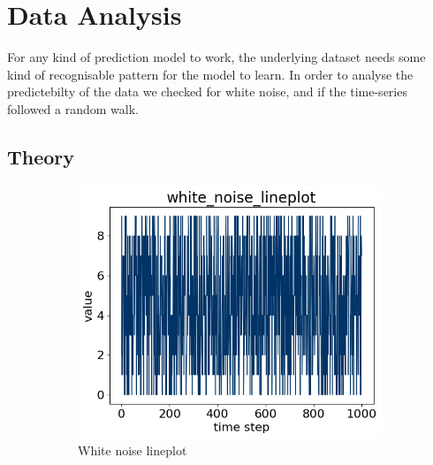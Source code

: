 \section{Data Analysis}
\label{section:Data:DataAnalysis}

For any kind of prediction model to work, the underlying dataset needs some kind of recognisable pattern for
the model to learn.
In order to analyse the predictebilty of the data we checked for white noise, and if the time-series followed a random walk.

\subsection*{Theory}

\begin{figure}[H]
  \centering
  \caption{Syntetic data, noise and random values.}
  \label{fig:dataset:white_noise_random_wald}
  \begin{subfigure}[b]{0.4\textwidth}
    \includegraphics[width=\textwidth]{./figs/code_generated/data_exploration/white_noise_lineplot.png}
    \hfill
    \caption{White noise lineplot}
    \label{fig:dataset:white_noise}
  \end{subfigure}
  \begin{subfigure}[b]{0.4\textwidth}

\end{subfigure}
\end{figure}
